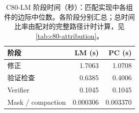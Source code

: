 \begin{table}[t]
\centering
\caption{C80-LM 阶段时间（秒）：匹配实现中各组件的边际中位数。各阶段分别汇总；总时间比率由配对的完整路径计时计算，见 \cref{tab:c80-attribution}。}
\label{tab:phase-costs}
\small
\begin{tabular}{@{}lrr@{}}
\toprule
阶段 & LM (s) & PC (s) \\
\midrule
修正 & 1.7063 & 1.0708 \\
验证检查 & 0.6385 & 0.4006 \\
Verifier & 0.1045 & 0.1045 \\
Mask / compaction & 0.000306 & 0.003370 \\
\bottomrule
\end{tabular}
\end{table}
